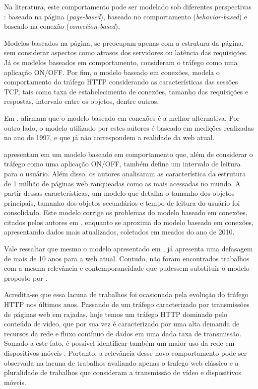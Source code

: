Na literatura, este comportamento pode ser modelado sob diferentes perspectivas \cite{Cheng2013}: baseado na página (\textit{page-based}), baseado no comportamento (\textit{behavior-based}) e baseado na conexão (\textit{conection-based}).

Modelos baseados na página, se preocupam apenas com a estrutura da página, sem considerar aspectos como atrasos dos servidores ou latência das requisições. Já os modelos baseados em comportamento, consideram o tráfego como uma aplicação ON/OFF. Por fim, o modelo baseado em conexões, modela o comportamento do tráfego HTTP considerando as características das sessões TCP, tais como taxa de estabelecimento de conexões, tamanho das requisições e respostas, intervalo entre os objetos, dentre outros.

Em \cite{Cheng2013},  afirmam que o modelo baseado em conexões é a melhor alternativa. Por outro lado, o modelo utilizado por estes autores é baseado em medições realizadas no ano de 1997, e que já não correspondem a realidade da web atual.

 apresentam em \cite{Pries2012} um modelo baseado em comportamento que, além de considerar o tráfego como uma aplicação ON/OFF, também define um intervalo de leitura para o usuário. Além disso, os autores analisaram as característica da estrutura de 1 milhão de páginas web ranqueadas como as mais acessadas no mundo. A partir dessas características, um modelo que detalha o tamanho dos objetos principais, tamanho dos objetos secundários e tempo de leitura do usuário foi consolidado. Este modelo corrige os problemas do modelo baseado em conexões, citados pelos autores em \cite{Cheng2013}, enquanto se aproxima do modelo baseado em conexões, apresentando dados mais atualizados, coletados em meados do ano de 2010. 

Vale ressaltar que mesmo o modelo apresentado em \cite{Pries2012}, já apresenta uma defasagem de mais de 10 anos para a web atual. Contudo, não foram encontrados trabalhos com a mesma relevância e contemporaneidade que pudessem substituir o modelo proposto por .

Acredita-se que essa lacuna de trabalhos foi ocasionada pela evolução do tráfego HTTP nos últimos anos. Passando de um tráfego caracterizado por transmissões de páginas web em rajadas, hoje temos um tráfego HTTP dominado pelo conteúdo de vídeo, que por sua vez é caracterizado por uma alta demanda de recursos da rede e fluxo contínuo de dados em uma dada taxa de transmissão. Somado a este fato, é possível identificar também um maior uso da rede em dispositivos móveis \cite{cisco-newsroom-vni-2017-2022} \cite{g1-2016}. Portanto, a relevância desse novo comportamento pode ser observada na lacuna de trabalhos avaliando apenas o trafego web clássico e a pluralidade de trabalhos que consideram a transmissão de vídeo e dispositivos móveis.

